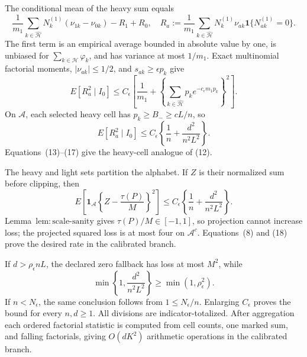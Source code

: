 The conditional mean of the heavy sum equals
\[
 \frac1{m_1}\sum_{k\in\widehat{\mathcal H}}N_k^{(1)}
 (\nu_{1k}-\nu_{0k})-R_1+R_0,
\quad
 R_a:=\frac1{m_1}\sum_{k\in\widehat{\mathcal H}}
 N_k^{(1)}\nu_{ak}\mathbf1\{N_{ak}^{(1)}=0\}.
\tag{15}
\]
The first term is an empirical average bounded in absolute value by one, is unbiased for \(\sum_{k\in\widehat{\mathcal H}}\varphi_k\), and has variance at most \(1/m_1\).  Exact multinomial factorial moments, \(|\nu_{ak}|\le1/2\), and \(s_{ak}\ge\epsilon p_k\) give
\[
 E[R_a^2\mid I_0]\le C_{\epsilon}\left[
 \frac1{m_1}+
 \left\{\sum_{k\in\widehat{\mathcal H}}p_ke^{-c_{\epsilon}m_1p_k}\right\}^2
 \right].
\tag{16}
\]
On \(\mathcal A\), each selected heavy cell has \(p_k\ge B_-\ge cL/n\), so
\[
 E[R_a^2\mid I_0]\le C_{\epsilon}\left\{\frac1n+\frac{d^2}{n^2L^2}\right\}.
\tag{17}
\]
Equations~(13)--(17) give the heavy-cell analogue of (12).

The heavy and light sets partition the alphabet.  If \(Z\) is their normalized sum before clipping, then
\[
 E\!\left[\mathbf1_{\mathcal A}\left\{Z-\frac{\tau(P)}M\right\}^2\right]
 \le C_{\epsilon}\left\{\frac1n+\frac{d^2}{n^2L^2}\right\}.
\tag{18}
\]
Lemma~\(\mathrm{lem:scale\text{-}sanity}\) gives \(\tau(P)/M\in[-1,1]\), so projection cannot increase loss; the projected squared loss is at most four on \(\mathcal A^c\).  Equations~(8) and (18) prove the desired rate in the calibrated branch.

If \(d>\rho_{\epsilon}nL\), the declared zero fallback has loss at most \(M^2\), while
\[
 \min\left\{1,\frac{d^2}{n^2L^2}\right\}\ge\min(1,\rho_{\epsilon}^2).
\tag{19}
\]
If \(n<N_{\epsilon}\), the same conclusion follows from \(1\le N_{\epsilon}/n\).  Enlarging \(C_{\epsilon}\) proves the bound for every \(n,d\ge1\).  All divisions are indicator-totalized.  After aggregation each ordered factorial statistic is computed from cell counts, one marked sum, and falling factorials, giving \(O(dK^2)\) arithmetic operations in the calibrated branch.